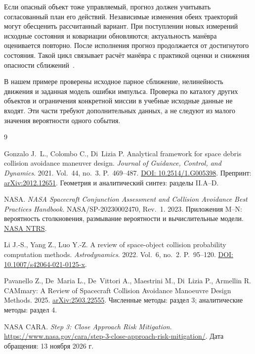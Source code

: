 \documentclass[a4paper,11pt]{article}
\numberwithin{equation}{section}
\begin{document}
Если опасный объект тоже управляемый, прогноз должен учитывать
согласованный план его действий. Независимые изменения обеих
траекторий могут обесценить рассчитанный вариант.
При поступлении новых измерений исходные состояния и ковариации
обновляются; актуальность манёвра оценивается повторно.
После исполнения прогноз продолжается от достигнутого состояния.
Такой цикл связывает расчёт манёвра с практикой оценки
и снижения опасности сближений~\cite{cara}.

В нашем примере проверены исходное парное сближение,
нелинейность движения и заданная модель ошибки импульса.
Проверка по каталогу других объектов и ограничения конкретной
миссии в учебные исходные данные не входят. Эти части требуют
дополнительных данных, а не следуют из малого значения
вероятности одного события.


\FloatBarrier
\begin{thebibliography}{9}
Gonzalo J.~L., Colombo C., Di~Lizia P.
Analytical framework for space debris collision avoidance maneuver design.
\emph{Journal of Guidance, Control, and Dynamics}. 2021.
Vol.~44, no.~3. P.~469--487.
\href{https://doi.org/10.2514/1.G005398}{DOI: 10.2514/1.G005398}.
Препринт: \href{https://arxiv.org/abs/2012.12651}{arXiv:2012.12651}.
Геометрия и аналитический синтез: разделы II.A--D.

NASA. \emph{NASA Spacecraft Conjunction Assessment and Collision
Avoidance Best Practices Handbook}. NASA/SP-20230002470, Rev.~1.
2023. Приложения M--N: вероятность столкновения,
размывание вероятности и вычислительные модели.
\href{https://ntrs.nasa.gov/citations/20230002470}{NASA NTRS}.

Li J.-S., Yang Z., Luo Y.-Z.
A review of space-object collision probability computation methods.
\emph{Astrodynamics}. 2022. Vol.~6, no.~2. P.~95--120.
\href{https://doi.org/10.1007/s42064-021-0125-x}{DOI: 10.1007/s42064-021-0125-x}.

Pavanello Z., De~Maria L., De~Vittori A., Maestrini M.,
Di~Lizia P., Armellin R.
CAMmary: A Review of Spacecraft Collision Avoidance Manoeuvre Design Methods.
2025. \href{https://arxiv.org/abs/2503.22555}{arXiv:2503.22555}.
Численные методы: раздел 3; аналитические методы: раздел 4.

NASA CARA. \emph{Step 3: Close Approach Risk Mitigation}.
\url{https://www.nasa.gov/cara/step-3-close-approach-risk-mitigation/}.
Дата обращения: 13 ноября 2026 г.
\end{thebibliography}
\end{document}
